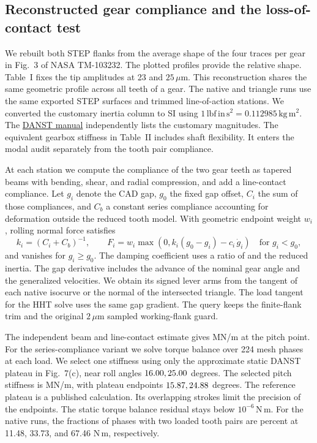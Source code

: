 \subsection{Reconstructed gear compliance and the loss-of-contact test}

We rebuilt both STEP flanks from the average shape of the four traces per gear in Fig.~3 of NASA TM-103232. The plotted profiles provide the relative shape. Table~I fixes the tip amplitudes at 23 and \(25\,\mu\mathrm m\). This reconstruction shares the same geometric profile across all teeth of a gear. The native and triangle runs use the same exported STEP surfaces and trimmed line-of-action stations. We converted the customary inertia column to SI using \(1\,\mathrm{lbf\,in\,s^2}=0.112985\,\mathrm{kg\,m^2}\). The \href{https://ntrs.nasa.gov/citations/19930018861}{DANST manual} independently lists the customary magnitudes. The equivalent gearbox stiffness in Table~II includes shaft flexibility. It enters the modal audit separately from the tooth pair compliance.

At each station we compute the compliance of the two gear teeth as tapered beams with bending, shear, and radial compression, and add a line-contact compliance. Let \(g_i\) denote the CAD gap, \(g_0\) the fixed gap offset, \(C_i\) the sum of those compliances, and \(C_b\) a constant series compliance accounting for deformation outside the reduced tooth model. With geometric endpoint weight \(w_i\), rolling normal force satisfies
\[
 k_i=(C_i+C_b)^{-1},\qquad
 F_i=w_i\max\!\left(0,k_i(g_0-g_i)-c_i\,\dot g_i\right)
 \quad\text{for }g_i<g_0 ,
\]
and vanishes for \(g_i\ge g_0\). The damping coefficient uses a ratio of \NasaRevisedDamping{} and the reduced inertia. The gap derivative includes the advance of the nominal gear angle and the generalized velocities. We obtain its signed lever arms from the tangent of each native isocurve or the normal of the intersected triangle. The load tangent for the HHT solve uses the same gap gradient. The query keeps the finite-flank trim and the original \(2\,\mu\mathrm m\) sampled working-flank guard.

The independent beam and line-contact estimate gives \NasaRevisedKBeam{} MN/m at the pitch point. For the series-compliance variant we solve torque balance over 224 mesh phases at each load. We select one stiffness using only the approximate static DANST plateau in Fig.~7(c), near roll angles \(16.00, 25.00\) degrees. The selected pitch stiffness is \NasaRevisedStiffness{} MN/m, with plateau endpoints \(15.87, 24.88\) degrees. The reference plateau is a published calculation. Its overlapping strokes limit the precision of the endpoints. The static torque balance residual stays below \(10^{-6}\,\mathrm{N\,m}\). For the native runs, the fractions of phases with two loaded tooth pairs are \NasaRevisedDualShares{} percent at 11.48, 33.73, and 67.46 N\,m, respectively.

